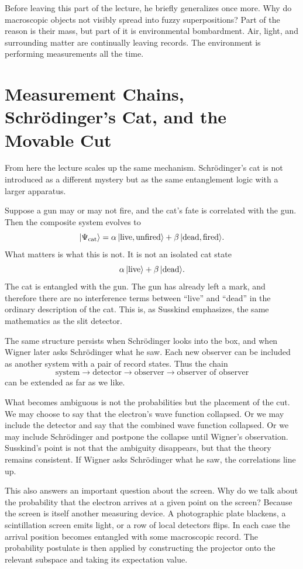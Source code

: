 Before leaving this part of the lecture, he briefly generalizes once more. Why do macroscopic objects not visibly spread into fuzzy superpositions? Part of the reason is their mass, but part of it is environmental bombardment. Air, light, and surrounding matter are continually leaving records. The environment is performing measurements all the time.

\section{Measurement Chains, Schr\"odinger's Cat, and the Movable Cut}

From here the lecture scales up the same mechanism. Schr\"odinger's cat is not introduced as a different mystery but as the same entanglement logic with a larger apparatus.

Suppose a gun may or may not fire, and the cat's fate is correlated with the gun. Then the composite system evolves to
\begin{equation}
|\Psi_{\mathrm{cat}}\rangle
=
\alpha\,|{\rm live},{\rm unfired}\rangle
+
\beta\,|{\rm dead},{\rm fired}\rangle .
\end{equation}
What matters is what this is not. It is not an isolated cat state
\[
\alpha\,|{\rm live}\rangle+\beta\,|{\rm dead}\rangle .
\]
The cat is entangled with the gun. The gun has already left a mark, and therefore there are no interference terms between ``live'' and ``dead'' in the ordinary description of the cat. This is, as Susskind emphasizes, the same mathematics as the slit detector.

The same structure persists when Schr\"odinger looks into the box, and when Wigner later asks Schr\"odinger what he saw. Each new observer can be included as another system with a pair of record states. Thus the chain
\[
\text{system} \longrightarrow \text{detector} \longrightarrow \text{observer} \longrightarrow \text{observer of observer}
\]
can be extended as far as we like.

What becomes ambiguous is not the probabilities but the placement of the cut. We may choose to say that the electron's wave function collapsed. Or we may include the detector and say that the combined wave function collapsed. Or we may include Schr\"odinger and postpone the collapse until Wigner's observation. Susskind's point is not that the ambiguity disappears, but that the theory remains consistent. If Wigner asks Schr\"odinger what he saw, the correlations line up.

This also answers an important question about the screen. Why do we talk about the probability that the electron arrives at a given point on the screen? Because the screen is itself another measuring device. A photographic plate blackens, a scintillation screen emits light, or a row of local detectors flips. In each case the arrival position becomes entangled with some macroscopic record. The probability postulate is then applied by constructing the projector onto the relevant subspace and taking its expectation value.

